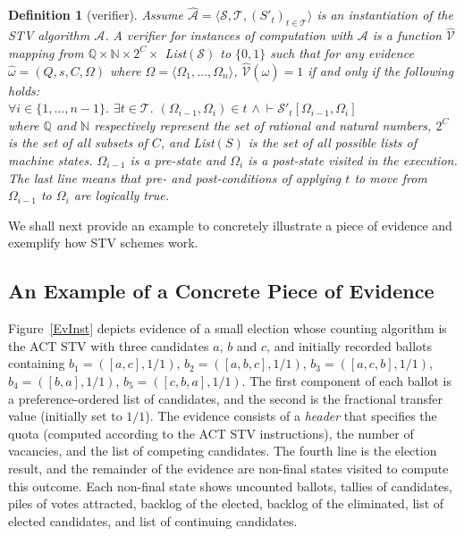 \documentclass[10pt,conference]{IEEEtran}
\newtheorem{definition}{Definition}
\begin{document}
\begin{definition}[verifier]\label{verifier}
Assume $\hat{\mathcal{A}}= \langle \mathcal{S}, \mathcal{T}, (S'_t)_{t \in \mathcal{T}} \rangle$ is an instantiation of the STV algorithm $\mathcal{A}$. A verifier for instances of computation with $\mathcal{A}$ is a function $\hat{\mathcal{V}}$ mapping from $\mathbb{Q}\times\mathbb{N}\times 2^{C}\times$ \textsf{List}$(\mathcal{S})$ to $\{0,1\}$ such that for any evidence $\hat{\omega} = (Q,s,C,\Omega)$ where $\Omega=\langle\Omega_{1},\dots,\Omega_{n}\rangle$, $\hat{\mathcal{V}}(\hat{\omega}) = 1$ if and only if the following holds:\\
$\forall i\in\{1,\dots,n-1\}.$ 
$\exists t\in\mathcal{T}.$  $(\Omega_{i-1},\Omega_{i})\in t$ $\wedge~\vdash\mathcal{S}'_{t}[\Omega_{i-1},\Omega_{i}]$\\ 
where $\mathbb{Q}$ and $\mathbb{N}$ respectively represent the set of rational and natural numbers, $2^{C}$ is the set of all subsets of $C$, and \textsf{List}$(S)$ is the set of all possible lists of machine states. $\Omega_{i-1}$ is a pre-state and $\Omega_{i}$ is a post-state visited in the execution. The last line means that pre- and post-conditions  of applying $t$ to move from $\Omega_{i-1}$ to $\Omega_{i}$  are logically true. 
\end{definition} 
We shall next provide an example to concretely illustrate a piece of evidence and exemplify how STV schemes work. 
 \subsection{An Example of a Concrete Piece of Evidence}
\label{subsec:InstEv}
Figure~\ref{EvInst} depicts evidence of a small election whose counting algorithm is the ACT STV 
with three candidates $a$, $b$ and $c$, and initially recorded ballots containing
$b_1=([a,c],1/1)$, $b_2=([a,b,c],1/1)$, $b_3=([a,c,b],1/1)$,
$b_4=([b,a],1/1)$, $b_5=([c,b,a],1/1)$.  The first component of each ballot is a preference-ordered list of candidates, and the second is the fractional transfer value (initially set to $1/1$). The evidence consists of a \emph{header} that specifies the quota (computed according to the ACT STV instructions), the number of vacancies, and the list of competing candidates. 
The fourth line is the election result, and the remainder of the evidence are non-final states visited to compute this
outcome. Each non-final state shows uncounted ballots, tallies of candidates, piles of votes attracted, backlog of the elected, backlog of the eliminated, list of elected candidates, and list of continuing candidates. 
\end{document}
